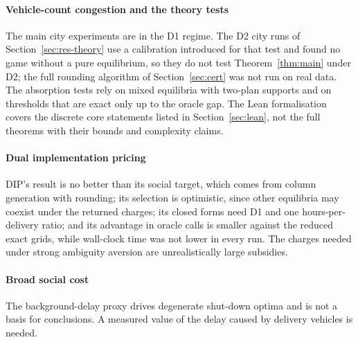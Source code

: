 \documentclass[preprint,12pt]{elsarticle}
\theoremstyle{definition}
\theoremstyle{remark}
\begin{document}
\paragraph{Vehicle-count congestion and the theory tests} The main city experiments are in the D1 regime. The D2 city runs of Section~\ref{sec:res-theory} use a calibration introduced for that test and found no game without a pure equilibrium, so they do not test Theorem~\ref{thm:main} under D2; the full rounding algorithm of Section~\ref{sec:cert} was not run on real data. The absorption tests rely on mixed equilibria with two-plan supports and on thresholds that are exact only up to the oracle gap. The Lean formalisation covers the discrete core statements listed in Section~\ref{sec:lean}, not the full theorems with their bounds and complexity claims.

\paragraph{Dual implementation pricing} DIP's result is no better than its social target, which comes from column generation with rounding; its selection is optimistic, since other equilibria may coexist under the returned charges; its closed forms need D1 and one hours-per-delivery ratio; and its advantage in oracle calls is smaller against the reduced exact grids, while wall-clock time was not lower in every run. The charges needed under strong ambiguity aversion are unrealistically large subsidies.

\paragraph{Broad social cost} The background-delay proxy drives degenerate shut-down optima and is not a basis for conclusions. A measured value of the delay caused by delivery vehicles is needed.
\end{document}
